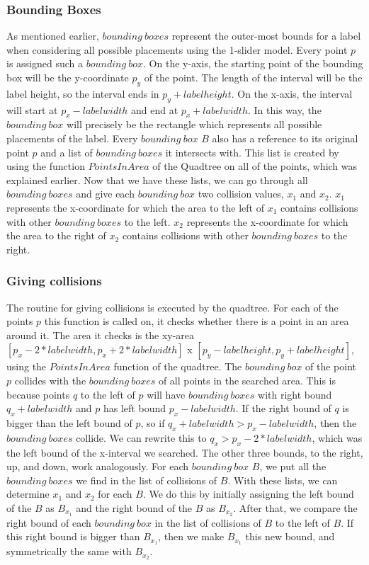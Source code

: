 \documentclass[crop=false,a4paper,oneside,11pt]{article}
\begin{document}
\subsubsection{Bounding Boxes}
As mentioned earlier, $bounding \ boxes$ represent the outer-most bounds for a label when considering all possible placements using the 1-slider model. Every point $p$ is assigned such a $bounding \ box$. On the y-axis, the starting point of the bounding box will be the y-coordinate $p_y$ of the point. The length of the interval will be the label height, so the interval ends in $p_y + labelheight$. On the x-axis, the interval will start at $p_x - labelwidth$ and end at $p_x+labelwidth$. In this way, the $bounding \ box$ will precisely be the rectangle which represents all possible placements of the label. Every $bounding \ box$ $B$ also has a reference to its original point $p$ and a list of $bounding \ boxes$ it intersects with. This list is created by using the function $PointsInArea$ of the Quadtree on all of the points, which was explained earlier. Now that we have these lists, we can go through all $bounding \ boxes$ and give each $bounding \ box$ two collision values, $x_1$ and $x_2$. $x_1$ represents the x-coordinate for which the area to the left of $x_1$ contains collisions with other $bounding \ boxes$ to the left. $x_2$ represents the x-coordinate for which the area to the right of $x_2$ contains collisions with other $bounding \ boxes$ to the right. 

\subsubsection{Giving collisions}
The routine for giving collisions is executed by the quadtree. For each of the points $p$ this function is called on, it checks whether there is a point in an area around it. The area it checks is the xy-area $[p_x - 2*labelwidth, p_x + 2*labelwidth]$ x $[p_y - labelheight, p_y + labelheight]$, using the $PointsInArea$ function of the quadtree. The $bounding \ box$ of the point $p$ collides with the $bounding \ boxes$ of all points in the searched area. This is because points $q$ to the left of $p$ will have $bounding \ boxes$ with right bound $q_x + labelwidth$ and $p$ has left bound $p_x - labelwidth$. If the right bound of $q$ is bigger than the left bound of $p$, so if $q_x + labelwidth > p_x - labelwidth$, then the $bounding \ boxes$ collide. We can rewrite this to $q_x > p_x - 2*labelwidth$, which was the left bound of the x-interval we searched. The other three bounds, to the right, up, and down, work analogously. For each $bounding \ box$ $B$, we put all the $bounding \ boxes$ we find in the list of collisions of $B$. With these lists, we can determine $x_1$ and $x_2$ for each $B$. We do this by initially assigning the left bound of the $B$ as $B_{x_1}$ and the right bound of the $B$ as $B_{x_2}$. After that, we compare the right bound of each $bounding \ box$ in the list of collisions of $B$ to the left of $B$. If this right bound is bigger than $B_{x_1}$, then we make $B_{x_1}$ this new bound, and symmetrically the same with $B_{x_2}$. 
\end{document}
